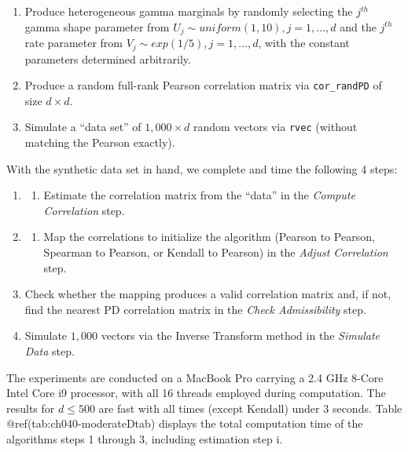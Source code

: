 \documentclass[
]{jss}
\providecommand{\tightlist}{%
  \setlength{\itemsep}{0pt}\setlength{\parskip}{0pt}}
\begin{document}
\begin{enumerate}
\def\labelenumi{\arabic{enumi}.}
\tightlist
\item
  Produce heterogeneous gamma marginals by randomly selecting the
  \(j^{th}\) gamma shape parameter from
  \(U_j \sim uniform(1,10), j=1,\ldots,d\) and the \(j^{th}\) rate
  parameter from \(V_j \sim exp(1/5), j=1,\ldots,d\), with the constant
  parameters determined arbitrarily.
\item
  Produce a random full-rank Pearson correlation matrix via
  \texttt{cor\_randPD} of size \(d \times d\).
\item
  Simulate a ``data set'' of \(1,000 \times d\) random vectors via
  \texttt{rvec} (without matching the Pearson exactly). 
\end{enumerate}

With the synthetic data set in hand, we complete and time the following
4 steps:


\begin{enumerate}
\def\labelenumi{\arabic{enumi}.}
\item
  \begin{enumerate}
  \def\labelenumii{\alph{enumii})}
  \tightlist
  \item
    Estimate the correlation matrix from the ``data'' in the
    \emph{Compute Correlation} step.
  \end{enumerate}
\item
  \begin{enumerate}
  \def\labelenumii{\alph{enumii})}
  \setcounter{enumii}{1}
  \tightlist
  \item
    Map the correlations to initialize the algorithm (Pearson to
    Pearson, Spearman to Pearson, or Kendall to Pearson) in the
    \emph{Adjust Correlation} step.
  \end{enumerate}
\item
  Check whether the mapping produces a valid correlation matrix and, if
  not, find the nearest PD correlation matrix in the \emph{Check
  Admissibility} step.
\item
  Simulate \(1,000\) vectors via the Inverse Transform method in the
  \emph{Simulate Data} step. 
\end{enumerate}

The experiments are conducted on a MacBook Pro carrying a 2.4 GHz 8-Core
Intel Core i9 processor, with all 16 threads employed during
computation. The results for \(d \leq 500\) are fast with all times
(except Kendall) under 3 seconds. Table @ref(tab:ch040-moderateDtab)
displays the total computation time of the algorithms steps 1 through 3,
including estimation step i.
\end{document}
